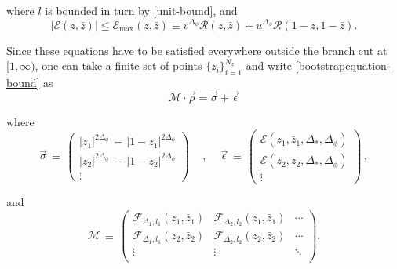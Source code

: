 \documentclass[letterpaper]{article}
\numberwithin{equation}{section}
\begin{document}
where $l$ is bounded in turn by
  \ref{unit-bound}, and 
\begin{equation}
\label{error-bound}
  |\mathcal{E}(z,\bar z)| \leq \mathcal{E}_{\mathrm{max}}(z,\bar z) \equiv
  v^{\Delta_\phi}\mathcal{R}(z,\bar z)
  +
  u^{\Delta_\phi}\mathcal{R}(1-z,1-\bar z).
\end{equation} 

Since these equations have to be satisfied everywhere outside the branch cut at
\([1,\infty)\), one can take a finite set of points $\{z_i\}_{i=1}^{N_z}$ and
write \ref{bootstrapequation-bound} as
\begin{equation}
  \mathcal{M}\cdot \vec{\rho} = \vec{\sigma} + \vec{\epsilon}
\label{matrix-boo}
\end{equation}

where 
\begin{equation}
\vec{\sigma} \, \equiv \, \left( \begin{matrix}
                      |z_1|^{2\Delta_\phi} \, - \, |1-z_1|^{2 \Delta_\phi}\\  |z_2|^{2\Delta_\phi} \, - \, |1-z_2|^{2 \Delta_\phi} \\ \vdots
                     \end{matrix} \right) 
                     \quad \, , \, \quad 
                      \vec{\epsilon} \, \equiv \, 
                          \left( \begin{matrix}
                                  \mathcal{E}(z_1,\bar z_1,\Delta_*,\Delta_\phi) \\
                                  \mathcal{E}(z_2,\bar z_2,\Delta_*,\Delta_\phi) \\
                                  \vdots
                                 \end{matrix} \right)  \, ,
\end{equation}

and
\begin{equation}
\mathcal{M} \, \equiv \, \left( \begin{matrix}
  \mathcal{F}_{\Delta_1,l_1}(z_1, \bar z_1) &\mathcal{F}_{\Delta_2,l_2}(z_1, \bar
  z_1) & \cdots \\
  \mathcal{F}_{\Delta_1,l_1}(z_2, \bar z_2) &\mathcal{F}_{\Delta_2,l_2}(z_2, \bar
  z_2) & \cdots \\
  \vdots  & \vdots &\ddots\\
                     \end{matrix} \right) .
                     \label{matrix-op}
\end{equation}
\end{document}
